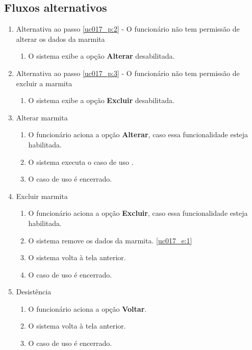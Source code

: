 \subsection{Fluxos alternativos}

\begin{enumerate}[label=A\arabic*]
	\item Alternativa ao passo \ref{uc017_p:2} - O funcionário não tem permissão de alterar os dados da marmita \label{uc017_a:1}
	\begin{enumerate}[label*=.\arabic*]
		\item O sistema exibe a opção \textbf{Alterar} desabilitada.
	\end{enumerate}
	
	\item Alternativa ao passo \ref{uc017_p:3} - O funcionário não tem permissão de excluir a marmita \label{uc017_a:2}
	\begin{enumerate}[label*=.\arabic*]
		\item O sistema exibe a opção \textbf{Excluir} desabilitada.
	\end{enumerate}
	
	\item Alterar marmita
	\begin{enumerate}[label*=.\arabic*]
		\item O funcionário aciona a opção \textbf{Alterar}, caso essa funcionalidade esteja habilitada.
		\item O sistema executa o caso de uso .
		\item O caso de uso é encerrado.
	\end{enumerate}
	
	\item Excluir marmita
	\begin{enumerate}[label*=.\arabic*]
		\item O funcionário aciona a opção \textbf{Excluir}, caso essa funcionalidade esteja habilitada.
		\item O sistema remove os dados da marmita. \label{uc017_a:4:2}\ref{uc017_e:1}
		\item O sistema volta à tela anterior.
		\item O caso de uso é encerrado.
	\end{enumerate}
	
	\item Desistência
	\begin{enumerate}[label*=.\arabic*]
		\item O funcionário aciona a opção \textbf{Voltar}.
		\item O sistema volta à tela anterior.
		\item O caso de uso é encerrado.		
	\end{enumerate}
\end{enumerate}

